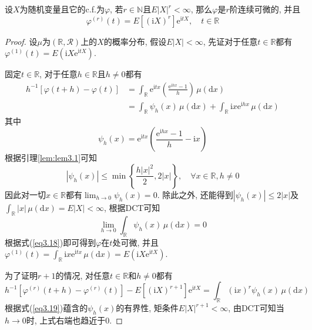 \documentclass[cn, 12pt, math=mtpro2, bibstyle=apa, blue, twocol]{elegantbook}
\newcommand{\R}{\mathbb{R}}
\newcommand{\itx}{\text{e}^{\text{i}tX}}
\begin{document}
\begin{theorem}
  设$X$为随机变量且它的c.f.为$\varphi$, 若$r\in\mathbb{N}$且$E|X|^r<\infty$, 那么$\varphi$是$r$阶连续可微的, 并且
  $$\varphi^{(r)}(t)=E[(\text{i}X)^r]\itx,\quad t\in\R$$
\end{theorem}
\begin{proof}
  设$\mu$为$(\R,\mathcal{R})$上的$X$的概率分布, 假设$E|X|<\infty$, 先证对于任意$t\in\R$都有$\varphi^{(1)}(t)=E(\text{i}X\itx)$.

  固定$t\in\R$, 对于任意$h\in\R$且$h\ne0$都有
  \begin{align}
  h^{-1}[\varphi(t+h)-\varphi(t)]&=\int_\R\text{e}^{\text{i}tx}\left(\frac{\text{e}^{\text{i}hx}-1}{h}\right)\,\mu(\text{d}x) \nonumber \\
  &=\int_\R\psi_h(x)\,\mu(\text{d}x)+\int_\R\text{i}x\text{e}^{\text{i}hx}\,\mu(\text{d}x) \label{eq3.18}
  \end{align}
  其中
  $$\psi_h(x)=\text{e}^{\text{i}tx}\left(\frac{\text{e}^{\text{i}hx}-1}{h}-\text{i}x\right)$$
  根据引理\ref{lem:lem3.1}可知
  \begin{equation}\label{eq3.19}
    |\psi_h(x)|\leq\min\left\{\frac{h|x|^2}{2},2|x|\right\},\quad\forall x\in\R, h\neq0
  \end{equation}
  因此对一切$x\in\R$都有$\lim_{h\to0}\psi_h(x)=0$. 除此之外, 还能得到$|\psi_h(x)|\leq2|x|$及$\int_\R|x|\,\mu(\text{d}x)=E|X|<\infty$, 根据DCT可知
  $$\lim_{h\to0}\int_\R\psi_h(x)\,\mu(\text{d}x)=0$$
  根据式(\ref{eq3.18})即可得到$\varphi$在$t$处可微, 并且$\varphi^{(1)}(t)=\int_\R\text{i}x\text{e}^{\text{i}tx}\,\mu(\text{d}x)=E(\text{i}X\itx)$.

  为了证明$r+1$的情况, 对任意$t\in\R$和$h\ne0$都有
  $$h^{-1}[\varphi^{(r)}(t+h)-\varphi^{(r)}(t)]-E[(\text{i}X)^{r+1}]\itx=\int_\R(\text{i}x)^r\psi_h(x)\,\mu(\text{d}x)$$
  根据式(\ref{eq3.19})蕴含的$\psi_h(x)$的有界性, 矩条件$E|X|^{r+1}<\infty$, 由DCT可知当$h\to0$时, 上式右端也趋近于0.
\end{proof}
\end{document}
